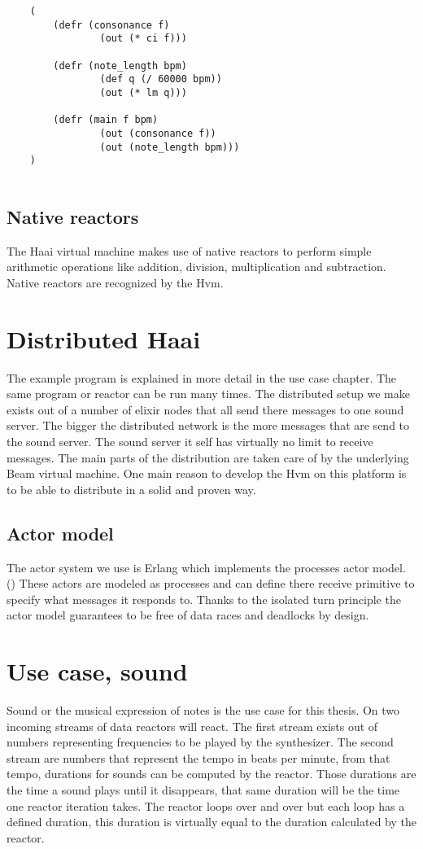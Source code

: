 \documentclass[a4paper]{book}
\begin{document}
\begin{verbatim}
	(
		(defr (consonance f)
		     	(out (* ci f)))
	
	    (defr (note_length bpm)
	      		(def q (/ 60000 bpm))
	            (out (* lm q)))
	
	    (defr (main f bpm)
	      		(out (consonance f))
	      		(out (note_length bpm)))
	)
	
\end{verbatim}

\section{Native reactors}
The Haai virtual machine makes use of native reactors to perform simple arithmetic operations like addition, division, multiplication and subtraction. Native reactors are recognized by the Hvm. 


\chapter{Distributed Haai}
The example program is explained in more detail in the use case chapter. The same program or reactor can be run many times. The distributed setup we make exists out of a number of elixir nodes that all send there messages to one sound server. The bigger the distributed network is the more messages that are send to the sound server. The sound server it self has virtually no limit to receive messages. The main parts of the distribution are taken care of by the underlying Beam virtual machine. One main reason to develop the Hvm on this platform is to be able to distribute in a solid and proven way.  

\section{Actor model}
The actor system we use is Erlang which implements the processes actor model. (\cite{de_koster_43_2016}) These actors are modeled as processes and can define there receive primitive to specify what messages it responds to. Thanks to the isolated turn principle the actor model guarantees to be free of data races and deadlocks by design.

\chapter{Use case, sound}
Sound or the musical expression of notes is the use case for this thesis. On two incoming streams of data reactors will react. The first stream exists out of numbers representing frequencies to be played by the synthesizer. The second stream are numbers that represent the tempo in beats per minute, from that tempo, durations for sounds can be computed by the reactor. Those durations are the time a sound plays until it disappears, that same duration will be the time one reactor iteration takes. The reactor loops over and over but each loop has a defined duration, this duration is virtually equal to the duration calculated by the reactor. 
\end{document}
